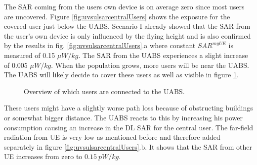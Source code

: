 \documentclass[twocolumn]{phdsymp} %
\begin{document}
The \gls{SAR} coming from the 
users own device is on average zero since most users are uncovered. 
Figure \ref{fig:uvsulsarcentralUsers} shows the exposure for the covered user
just below the \gls{UABS}. Scenario I already showed that the \gls{SAR} from the user's own device is only influenced by the flying height
and is also confirmed by the results in fig. \ref{fig:uvsulsarcentralUsers}.a where constant $SAR^{myUE}$ is measured of 0.15 $\mu W/kg$.
The \gls{SAR} from the \gls{UABS} experiences a slight increase of 0.005 $\mu W/kg$. When the population grows, more users
will be near the \gls{UABS}. The \gls{UABS} will likely decide to cover these users as well as visible in figure \ref{fig:connectionMap}.
\begin{figure}[h]
\hfill
{}
\caption{Overview of which users are connected to the \acs{UABS}.}
  \label{fig:connectionMap}
\end{figure}
\FloatBarrier
These users might have a slightly 
worse path loss because of obstructing buildings or somewhat bigger distance. The \gls{UABS} reacts to this by increasing 
his power consumption causing an increase in the \gls{DL} \gls{SAR} for the central user.
The far-field radiation from \gls{UE} is very low as mentioned before and therefore added separately in figure \ref{fig:uvsulsarcentralUsers}.b.
It shows that the \gls{SAR}  from other \gls{UE} increases from zero to $0.15\ pW/kg$. 
\end{document}
